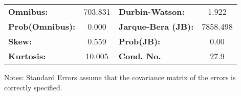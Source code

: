 \begin{center}
\begin{tabular}{lcccccc}
\bottomrule
\end{tabular}
\begin{tabular}{lclc}
\textbf{Omnibus:}       & 703.831 & \textbf{  Durbin-Watson:     } &    1.922  \\
\textbf{Prob(Omnibus):} &   0.000 & \textbf{  Jarque-Bera (JB):  } & 7858.498  \\
\textbf{Skew:}          &   0.559 & \textbf{  Prob(JB):          } &     0.00  \\
\textbf{Kurtosis:}      &  10.005 & \textbf{  Cond. No.          } &     27.9  \\
\bottomrule
\end{tabular}
\end{center}

Notes: \newline
 [1] Standard Errors assume that the covariance matrix of the errors is correctly specified.